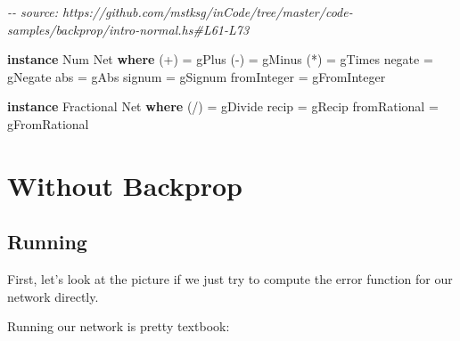 \documentclass[]{article}
\newenvironment{Shaded}{}{}
\newcommand{\CommentTok}[1]{\textcolor[rgb]{0.38,0.63,0.69}{\textit{#1}}}
\newcommand{\DataTypeTok}[1]{\textcolor[rgb]{0.56,0.13,0.00}{#1}}
\newcommand{\DecValTok}[1]{\textcolor[rgb]{0.25,0.63,0.44}{#1}}
\newcommand{\FunctionTok}[1]{\textcolor[rgb]{0.02,0.16,0.49}{#1}}
\newcommand{\KeywordTok}[1]{\textcolor[rgb]{0.00,0.44,0.13}{\textbf{#1}}}
\newcommand{\NormalTok}[1]{#1}
\newcommand{\OperatorTok}[1]{\textcolor[rgb]{0.40,0.40,0.40}{#1}}
\newcommand{\OtherTok}[1]{\textcolor[rgb]{0.00,0.44,0.13}{#1}}
\begin{document}
\begin{Shaded}
\begin{Highlighting}[]
\CommentTok{{-}{-} source: https://github.com/mstksg/inCode/tree/master/code{-}samples/backprop/intro{-}normal.hs\#L61{-}L73}

\KeywordTok{instance} \DataTypeTok{Num} \DataTypeTok{Net} \KeywordTok{where}
\NormalTok{    (}\OperatorTok{+}\NormalTok{)         }\OtherTok{=}\NormalTok{ gPlus}
\NormalTok{    (}\OperatorTok{{-}}\NormalTok{)         }\OtherTok{=}\NormalTok{ gMinus}
\NormalTok{    (}\OperatorTok{*}\NormalTok{)         }\OtherTok{=}\NormalTok{ gTimes}
    \FunctionTok{negate}      \OtherTok{=}\NormalTok{ gNegate}
    \FunctionTok{abs}         \OtherTok{=}\NormalTok{ gAbs}
    \FunctionTok{signum}      \OtherTok{=}\NormalTok{ gSignum}
    \FunctionTok{fromInteger} \OtherTok{=}\NormalTok{ gFromInteger}

\KeywordTok{instance} \DataTypeTok{Fractional} \DataTypeTok{Net} \KeywordTok{where}
\NormalTok{    (}\OperatorTok{/}\NormalTok{)          }\OtherTok{=}\NormalTok{ gDivide}
    \FunctionTok{recip}        \OtherTok{=}\NormalTok{ gRecip}
    \FunctionTok{fromRational} \OtherTok{=}\NormalTok{ gFromRational}
\end{Highlighting}
\end{Shaded}

\section{Without Backprop}\label{without-backprop}

\subsection{Running}\label{running}

First, let's look at the picture if we just try to compute the error function
for our network directly.

Running our network is pretty textbook:

\begin{Shaded}
\end{Shaded}
\end{document}
